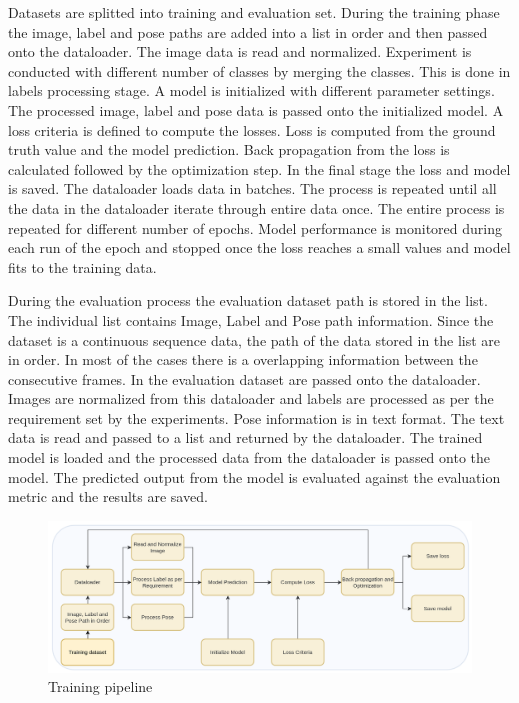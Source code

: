     Datasets are splitted into training and evaluation set. During the training phase the image, label and pose paths are added into a list in order and then passed onto the dataloader. The image data is read and normalized.  Experiment is conducted with different number of classes by merging the classes. This is done in labels  processing stage. A model is initialized with different parameter settings. The processed image, label and pose data is passed onto the initialized model. A loss criteria is defined to compute the losses. Loss is computed from the ground truth value and the model prediction. Back propagation from the loss is calculated followed by the optimization step. In the final stage the loss and model is saved. The dataloader loads data in batches. The process is repeated until all the data in the dataloader iterate through entire data once. The entire process is repeated for different number of epochs. Model performance is monitored during each run of the epoch and stopped once the loss reaches a small values and model fits to the training data. 
    
    During the evaluation process the evaluation dataset path is stored in the list. The individual list contains Image, Label and Pose path information. Since the dataset is a continuous sequence data, the path of the data stored in the list are in order. In most of the cases there is a overlapping information between the consecutive frames. In the evaluation dataset are passed onto the dataloader. Images are normalized from this dataloader and labels are processed as per the requirement set by the experiments. Pose information is in text format. The text data is read and passed to a list and returned by the dataloader. The trained model is loaded and the processed data from the dataloader is passed onto the model. The predicted output from the model is evaluated against the evaluation metric and the results are saved.      
    
    
   	\begin{figure}
    	\centering
    	\includegraphics[width=14cm]{images/training.png}
    	\caption{Training pipeline}
    	\label{fig:unet_training}
    \end{figure}

